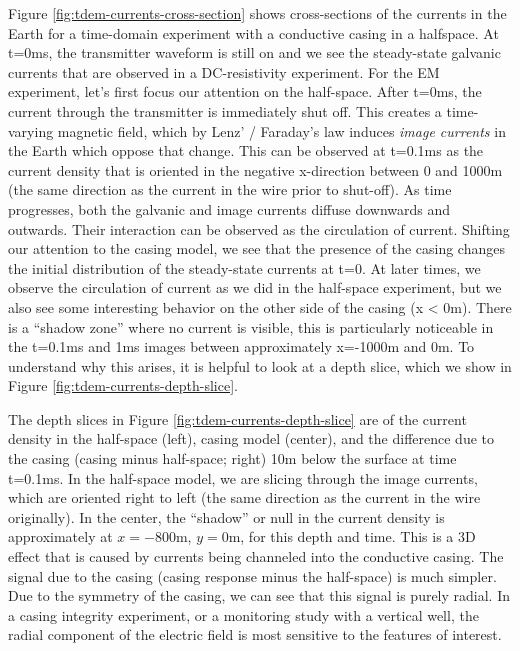 \documentclass[
    paper
]{geophysics}
\begin{document}
Figure \ref{fig:tdem-currents-cross-section} shows cross-sections of the currents in the Earth for a time-domain experiment with a conductive casing in a halfspace. At t=0ms, the transmitter waveform is still on and we see the steady-state galvanic currents that are observed in a DC-resistivity experiment. For the EM experiment, let’s first focus our attention on the half-space. After t=0ms, the current through the transmitter is immediately shut off. This creates a time-varying magnetic field, which by Lenz' / Faraday's law induces \emph{image currents} in the Earth which oppose that change. This can be observed at t=0.1ms as the current density that is oriented in the negative x-direction between 0 and 1000m (the same direction as the current in the wire prior to shut-off). As time progresses, both the galvanic and image currents diffuse downwards and outwards. Their interaction can be observed as the circulation of current. Shifting our attention to the casing model, we see that the presence of the casing changes the initial distribution of the steady-state currents at t=0. At later times, we observe the circulation of current as we did in the half-space experiment, but we also see some interesting behavior on the other side of the casing (x < 0m). There is a ``shadow zone'' where no current is visible, this is particularly noticeable in the t=0.1ms and 1ms images between approximately x=-1000m and 0m. To understand why this arises, it is helpful to look at a depth slice, which we show in Figure \ref{fig:tdem-currents-depth-slice}.



The depth slices in Figure \ref{fig:tdem-currents-depth-slice} are of the current density in the half-space (left), casing model (center), and the difference due to the casing (casing minus half-space; right) 10m below the surface at time t=0.1ms. In the half-space model, we are slicing through the image currents, which are oriented right to left (the same direction as the current in the wire originally). In the center, the ``shadow'' or null in the current density is approximately at $x=-800$m, $y=0$m, for this depth and time. This is a 3D effect that is caused by currents being channeled into the conductive casing. The signal due to the casing (casing response minus the half-space) is much simpler. Due to the symmetry of the casing, we can see that this signal is purely radial. In a casing integrity experiment, or a monitoring study with a vertical well, the radial component of the electric field is most sensitive to the features of interest.
\end{document}
